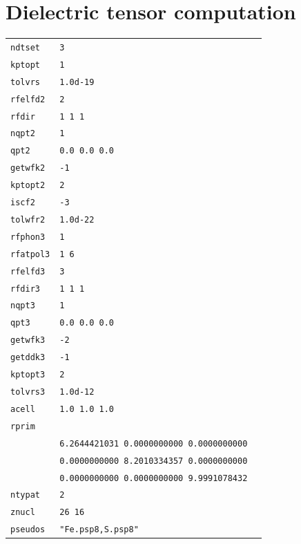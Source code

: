 \documentclass[11pt,a4paper]{article}
\begin{document}
\section{Dielectric tensor computation}
\label{Abi11}
\begin{center}
\begin{tabular}{lll}
\texttt{ndtset}&\texttt{3}&\\
\texttt{kptopt}&\texttt{1}&\\
\texttt{tolvrs}&\texttt{1.0d-19}&\\
\texttt{rfelfd2}&\texttt{2}\\
\texttt{rfdir}&\texttt{1 1 1}\\
\texttt{nqpt2}&\texttt{1}&\texttt{}\\
\texttt{qpt2}&\texttt{0.0 0.0 0.0}&\\
\texttt{getwfk2}&\texttt{-1}&\texttt{}\\
\texttt{kptopt2}&\texttt{2}\\
\texttt{iscf2}&\texttt{-3}\\
\texttt{tolwfr2}&\texttt{1.0d-22}&\texttt{}\\
\texttt{rfphon3}&\texttt{1}&\texttt{}\\
\texttt{rfatpol3}&\texttt{1 6}&\texttt{}\\
\texttt{rfelfd3}&\texttt{3}&\texttt{}\\
\texttt{rfdir3}&\texttt{1 1 1}&\texttt{}\\
\texttt{nqpt3}&\texttt{1}&\texttt{}\\
\texttt{qpt3}&\texttt{0.0 0.0 0.0}&\texttt{}\\
\texttt{getwfk3}&\texttt{-2}&\texttt{}\\
\texttt{getddk3}&\texttt{-1}&\texttt{}\\
\texttt{kptopt3}&\texttt{2}&\texttt{}\\
\texttt{tolvrs3}&\texttt{1.0d-12}&\texttt{}\\
\texttt{acell} & \texttt{1.0 1.0 1.0} & \\
\texttt{rprim}&&\\
&\texttt{6.2644421031    0.0000000000    0.0000000000}&\\
&\texttt{0.0000000000    8.2010334357    0.0000000000}&\\
&\texttt{0.0000000000    0.0000000000    9.9991078432}&\\
\texttt{ntypat} & \texttt{2} & \\
\texttt{znucl} & \texttt{26 16} & \\
\texttt{pseudos}&\texttt{"Fe.psp8,S.psp8"}&\\

\end{tabular}
\end{center}
\end{document}
